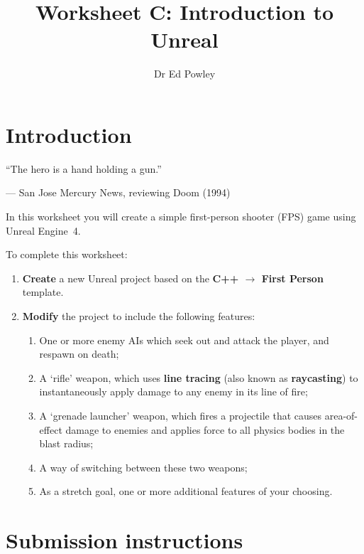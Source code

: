 \documentclass{../../fal_assignment}
\title{Worksheet C: Introduction to Unreal}
\author{Dr Ed Powley}
\begin{document}
\maketitle

\section*{Introduction}

\begin{marginquote}
``The hero is a hand holding a gun.''

--- San Jose Mercury News, reviewing Doom (1994)
\end{marginquote}

In this worksheet you will create a simple first-person shooter (FPS) game using Unreal Engine~4.

To complete this worksheet:
\begin{enumerate}[label=(\alph*)]
	\item \textbf{Create} a new Unreal project based on the \textbf{C++ $\to$ First Person} template.
	\item \textbf{Modify} the project to include the following features:
		\begin{enumerate}[label=(\roman*)]
			\item One or more enemy AIs which seek out and attack the player, and respawn on death;
			\item A `rifle' weapon, which uses \textbf{line tracing} (also known as \textbf{raycasting})
				to instantaneously apply damage to any enemy in its line of fire;
			\item A `grenade launcher' weapon, which fires a projectile that causes area-of-effect damage to enemies
				and applies force to all physics bodies in the blast radius;
			\item A way of switching between these two weapons;
			\item As a stretch goal, one or more additional features of your choosing.
		\end{enumerate}
\end{enumerate}

\section*{Submission instructions}
\end{document}

